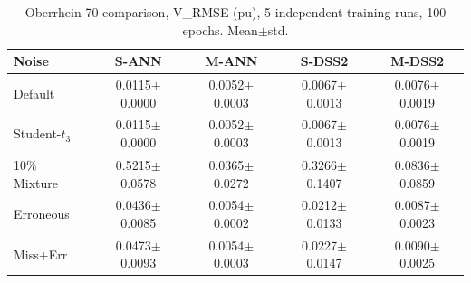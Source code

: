 \begin{table}[htbp]
\centering
\caption{Oberrhein-70 comparison, V\_RMSE (pu), 5 independent training runs, 100 epochs. Mean$\pm$std.}
\label{tab:70bus}
\footnotesize
\begin{tabular}{lcccc}
\toprule
Noise & S-ANN & M-ANN & S-DSS2 & M-DSS2 \\
\midrule
Default & 0.0115$\pm$0.0000 & 0.0052$\pm$0.0003 & 0.0067$\pm$0.0013 & 0.0076$\pm$0.0019 \\
Student-$t_3$ & 0.0115$\pm$0.0000 & 0.0052$\pm$0.0003 & 0.0067$\pm$0.0013 & 0.0076$\pm$0.0019 \\
10\% Mixture & 0.5215$\pm$0.0578 & 0.0365$\pm$0.0272 & 0.3266$\pm$0.1407 & 0.0836$\pm$0.0859 \\
Erroneous & 0.0436$\pm$0.0085 & 0.0054$\pm$0.0002 & 0.0212$\pm$0.0133 & 0.0087$\pm$0.0023 \\
Miss+Err & 0.0473$\pm$0.0093 & 0.0054$\pm$0.0003 & 0.0227$\pm$0.0147 & 0.0090$\pm$0.0025 \\
\bottomrule
\end{tabular}
\end{table}

